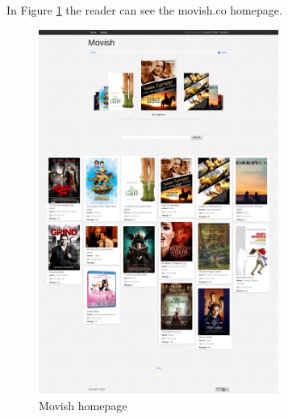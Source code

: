 In Figure \ref{fig:movish_homepage} the reader can see the movish.co homepage. 

\begin{figure}
  \centering
  \includegraphics[width=0.7\textwidth]{figures/movish-homepage.png}
  \caption{Movish homepage}
  \label{fig:movish_homepage}
\end{figure}

\acresetall